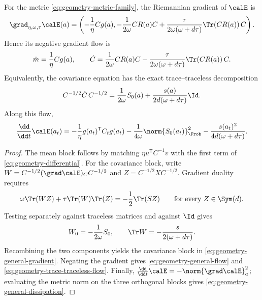 \begin{theorem}
\label{thm:geometry-general-flow}
For the metric \eqref{eq:geometry-metric-family}, the Riemannian gradient of
$\calE$ is
\begin{equation}
\label{eq:geometry-general-gradient}
    \grad_{\eta,\omega,\tau}\calE(a)
    =\left(
       -\frac1\eta Cg(a),
       -\frac1{2\omega}CR(a)C
       +\frac{\tau}{2\omega(\omega+d\tau)}
          \Tr(CR(a))\,C
      \right).
\end{equation}
Hence its negative gradient flow is
\begin{equation}
\label{eq:geometry-general-flow}
    \dot m
    =\frac1\eta Cg(a),
    \qquad
    \dot C
    =\frac1{2\omega}CR(a)C
     -\frac{\tau}{2\omega(\omega+d\tau)}\Tr(CR(a))\,C.
\end{equation}
Equivalently, the covariance equation has the exact trace--traceless
decomposition
\begin{equation}
\label{eq:geometry-trace-traceless-flow}
    C^{-1/2}\dot C\,C^{-1/2}
    =\frac1{2\omega}S_0(a)
     +\frac{s(a)}{2d(\omega+d\tau)}\Id.
\end{equation}
Along this flow,
\begin{equation}
\label{eq:geometry-general-dissipation}
    \frac{\dd}{\dd t}\calE(a_t)
    =-\frac1\eta g(a_t)^{\mathsf T}C_tg(a_t)
     -\frac1{4\omega}\norm{S_0(a_t)}_{\Frob}^2
     -\frac{s(a_t)^2}{4d(\omega+d\tau)}.
\end{equation}
\end{theorem}

\begin{proof}
The mean block follows by matching
$\eta u^{\mathsf T}C^{-1}v$ with the first term of
\eqref{eq:geometry-differential}.  For the covariance block, write
$W=C^{-1/2}(\grad\calE)_C C^{-1/2}$ and
$Z=C^{-1/2}XC^{-1/2}$.  Gradient duality requires
\[
    \omega\Tr(WZ)+\tau\Tr(W)\Tr(Z)
    =-\frac12\Tr(SZ)
    \qquad\text{for every }Z\in\Sym(d).
\]
Testing separately against traceless matrices and against $\Id$ gives
\[
    W_0=-\frac1{2\omega}S_0,
    \qquad
    \Tr W=-\frac{s}{2(\omega+d\tau)}.
\]
Recombining the two components yields the covariance block in
\eqref{eq:geometry-general-gradient}.  Negating the gradient gives
\eqref{eq:geometry-general-flow} and
\eqref{eq:geometry-trace-traceless-flow}.  Finally,
$\frac{\dd}{\dd t}\calE=-\norm{\grad\calE}_{a}^{2}$; evaluating the metric
norm on the three orthogonal blocks gives
\eqref{eq:geometry-general-dissipation}.
\end{proof}

